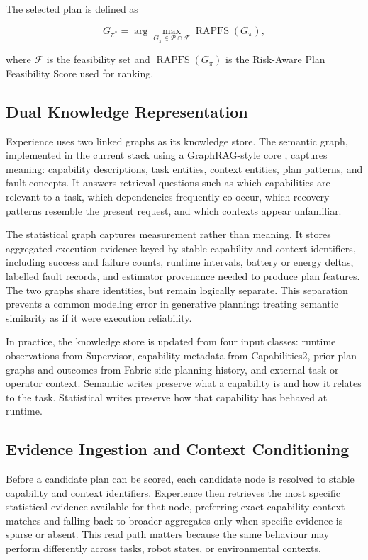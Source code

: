 \documentclass[letterpaper, 10pt, conference]{ieeeconf}
\begin{document}
The selected plan is defined as

\begin{equation}
G_{\pi^*}=\arg\max_{G_{\pi}\in \mathcal{P}\cap \mathcal{F}} \operatorname{RAPFS}(G_{\pi}),
\end{equation}

where $\mathcal{F}$ is the feasibility set and $\operatorname{RAPFS}(G_{\pi})$ is the Risk-Aware Plan Feasibility Score used for ranking.

\subsection{Dual Knowledge Representation}

Experience uses two linked graphs as its knowledge store. The semantic graph, implemented in the current stack using a GraphRAG-style core \cite{edge2025localglobalgraphrag}, captures meaning: capability descriptions, task entities, context entities, plan patterns, and fault concepts. It answers retrieval questions such as which capabilities are relevant to a task, which dependencies frequently co-occur, which recovery patterns resemble the present request, and which contexts appear unfamiliar.

The statistical graph captures measurement rather than meaning. It stores aggregated execution evidence keyed by stable capability and context identifiers, including success and failure counts, runtime intervals, battery or energy deltas, labelled fault records, and estimator provenance needed to produce plan features. The two graphs share identities, but remain logically separate. This separation prevents a common modeling error in generative planning: treating semantic similarity as if it were execution reliability.

In practice, the knowledge store is updated from four input classes: runtime observations from Supervisor, capability metadata from Capabilities2, prior plan graphs and outcomes from Fabric-side planning history, and external task or operator context. Semantic writes preserve what a capability is and how it relates to the task. Statistical writes preserve how that capability has behaved at runtime.

\subsection{Evidence Ingestion and Context Conditioning}

Before a candidate plan can be scored, each candidate node is resolved to stable capability and context identifiers. Experience then retrieves the most specific statistical evidence available for that node, preferring exact capability-context matches and falling back to broader aggregates only when specific evidence is sparse or absent. This read path matters because the same behaviour may perform differently across tasks, robot states, or environmental contexts.
\end{document}
